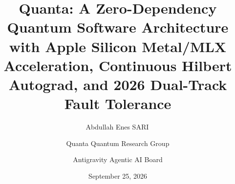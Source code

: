 \documentclass[aps,prx,twocolumn,superscriptaddress,nofootinbib]{revtex4-2}
\begin{document}
\title{Quanta: A Zero-Dependency Quantum Software Architecture with Apple Silicon Metal/MLX Acceleration, Continuous Hilbert Autograd, and 2026 Dual-Track Fault Tolerance}

\author{Abdullah Enes SARI\,}

\author{Quanta Quantum Research Group}

\author{Antigravity Agentic AI Board}

\date{September 25, 2026}

\end{document}
